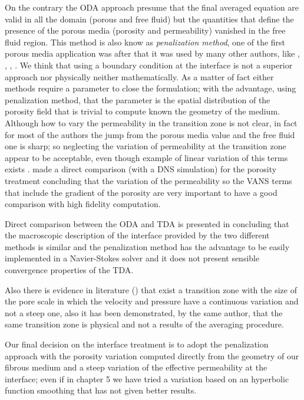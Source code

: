On the contrary the ODA approach presume that the final averaged equation are valid in all the domain (porous and free fluid) but the quantities that define the presence of the porous media (porosity and permeability) vanished in the free fluid region.
This method is also know as \textit{penalization method}, one of the first porous media application was \citet{caltagirone1994interaction} after that it was used by many other authors, like \citet{bruneau2004passive}, \citet{bruneau2008numerical}, \citet{bruneau2010coupling}, \citet{hussong2011continuum}.
We think that using a boundary condition at the interface is not a superior approach nor physically neither mathematically.
As a matter of fact either methods require a parameter to close the formulation; with the advantage, using penalization method, that the parameter is the spatial distribution of the porosity field that is trivial to compute known the geometry of the medium.
Although how to vary the permeability in the transition zone is not clear, in fact for most of the authors the jump from the porous media value and the free fluid one is sharp; so neglecting the variation of permeability at the transition zone appear to be acceptable, even though example of linear variation of this terms exists \citet{caltagirone1994interaction}.
\citet{hussong2011continuum} made a direct comparison (with a DNS simulation) for the porosity treatment concluding that the variation of the permeability so the VANS terms that include the gradient of the porosity are very important to have a good comparison with high fidelity computation.

Direct comparison between the ODA and TDA is presented in \citet{cimolin2013navier} concluding that the macroscopic description of the interface provided by the two different methods is similar and the penalization method has the advantage to be easily implemented in a Navier-Stokes solver and it does not present sensible convergence properties of the TDA.


Also there is evidence in literature (\citet{ochoa2017fluid}) that exist a transition zone with the size of the pore scale in which the velocity and pressure have a continuous variation and not a steep one, also it has been demonstrated, by the same author, that the same transition zone is physical and not a results of the averaging procedure.

Our final decision on the interface treatment is to adopt the penalization approach with the porosity variation computed directly from the geometry of our fibrous medium and a steep variation of the effective permeability at the interface; even if in chapter 5  we have tried a variation based on an hyperbolic function smoothing that has not given better results.



